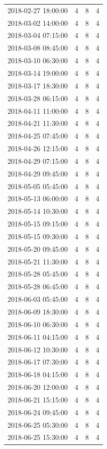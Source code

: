 \begin{tabular}{lrrr}
2018-02-27 18:00:00 & 4 & 8 & 4 \\
2018-03-02 14:00:00 & 4 & 8 & 4 \\
2018-03-04 07:15:00 & 4 & 8 & 4 \\
2018-03-08 08:45:00 & 4 & 8 & 4 \\
2018-03-10 06:30:00 & 4 & 8 & 4 \\
2018-03-14 19:00:00 & 4 & 8 & 4 \\
2018-03-17 18:30:00 & 4 & 8 & 4 \\
2018-03-28 06:15:00 & 4 & 8 & 4 \\
2018-04-11 11:00:00 & 4 & 8 & 4 \\
2018-04-21 11:30:00 & 4 & 8 & 4 \\
2018-04-25 07:45:00 & 4 & 8 & 4 \\
2018-04-26 12:15:00 & 4 & 8 & 4 \\
2018-04-29 07:15:00 & 4 & 8 & 4 \\
2018-04-29 09:45:00 & 4 & 8 & 4 \\
2018-05-05 05:45:00 & 4 & 8 & 4 \\
2018-05-13 06:00:00 & 4 & 8 & 4 \\
2018-05-14 10:30:00 & 4 & 8 & 4 \\
2018-05-15 09:15:00 & 4 & 8 & 4 \\
2018-05-15 09:30:00 & 4 & 8 & 4 \\
2018-05-20 09:45:00 & 4 & 8 & 4 \\
2018-05-21 11:30:00 & 4 & 8 & 4 \\
2018-05-28 05:45:00 & 4 & 8 & 4 \\
2018-05-28 06:45:00 & 4 & 8 & 4 \\
2018-06-03 05:45:00 & 4 & 8 & 4 \\
2018-06-09 18:30:00 & 4 & 8 & 4 \\
2018-06-10 06:30:00 & 4 & 8 & 4 \\
2018-06-11 04:15:00 & 4 & 8 & 4 \\
2018-06-12 10:30:00 & 4 & 8 & 4 \\
2018-06-17 07:30:00 & 4 & 8 & 4 \\
2018-06-18 04:15:00 & 4 & 8 & 4 \\
2018-06-20 12:00:00 & 4 & 8 & 4 \\
2018-06-21 15:15:00 & 4 & 8 & 4 \\
2018-06-24 09:45:00 & 4 & 8 & 4 \\
2018-06-25 05:30:00 & 4 & 8 & 4 \\
2018-06-25 15:30:00 & 4 & 8 & 4 \\

\end{tabular}
